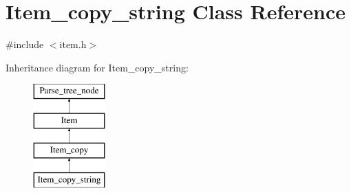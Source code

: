 \hypertarget{classItem__copy__string}{}\section{Item\+\_\+copy\+\_\+string Class Reference}
\label{classItem__copy__string}


{\ttfamily \#include $<$item.\+h$>$}

Inheritance diagram for Item\+\_\+copy\+\_\+string\+:\begin{figure}[H]
\begin{center}
\leavevmode
\includegraphics[height=4.000000cm]{classItem__copy__string}
\end{center}
\end{figure}
